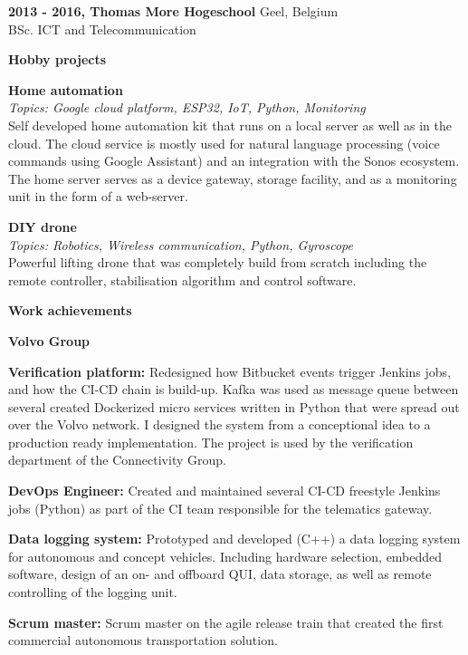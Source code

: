 \documentclass[a4paper,12pt,final]{memoir}
\newcommand{\Sep}{\vspace{1.5em}}
\newcommand{\SmallSep}{\vspace{0.5em}}
\newcommand{\CVSection}[1]
	{\Large\textbf{#1}\par
	\SmallSep\normalsize\normalfont}
\newcommand{\CVItem}[1]
	{\textbf{\color{NavyBlue} #1}}
\begin{document}
\CVItem{2013 - 2016, Thomas More Hogeschool} \hfill Geel, Belgium \\
BSc. ICT and Telecommunication
\Sep

\CVSection{Hobby projects}
\CVItem{Home automation} \\
\emph{Topics: Google cloud platform, ESP32, IoT, Python, Monitoring} \\
Self developed home automation kit that runs on a local server as well as in the cloud. The cloud service is mostly used for natural language processing (voice commands using Google Assistant) and an integration with the Sonos ecosystem. The home server serves as a device gateway, storage facility, and as a monitoring unit in the form of a web-server. 
\SmallSep

\CVItem{DIY drone} \\
\emph{Topics: Robotics, Wireless communication, Python, Gyroscope} \\
Powerful lifting drone that was completely build from scratch including the remote controller, stabilisation algorithm and control software.
\Sep

\clearpage
\framebreak
\framebreak


\CVSection{Work achievements}
\CVItem{Volvo Group}

\SmallSep
\textbf{Verification platform:} Redesigned how Bitbucket events trigger Jenkins jobs, and how the CI-CD chain is build-up. Kafka was used as message queue between several created Dockerized micro services written in Python that were spread out over the Volvo network. I designed the system from a conceptional idea to a production ready implementation. The project is used by the verification department of the Connectivity Group.
\SmallSep

\textbf{DevOps Engineer:} Created and maintained several CI-CD freestyle Jenkins jobs (Python) as part of the CI team responsible for the telematics gateway.
\SmallSep

\textbf{Data logging system:} Prototyped and developed (C++) a data logging system for autonomous and concept vehicles. Including hardware selection, embedded software, design of an on- and offboard QUI, data storage, as well as remote controlling of the logging unit. 
\SmallSep

\textbf{Scrum master:} Scrum master on the agile release train that created the first commercial autonomous transportation solution.
\SmallSep
\end{document}
